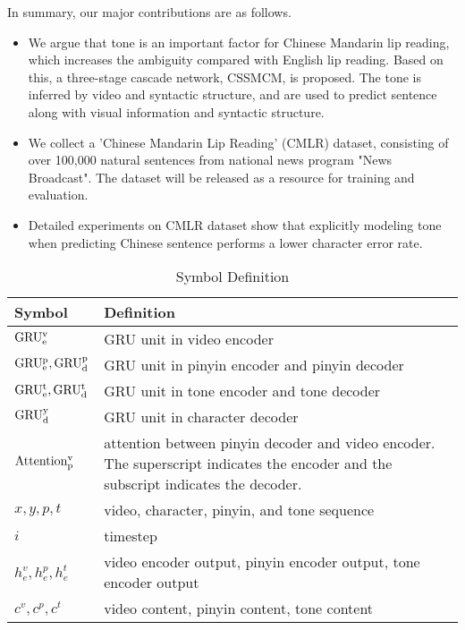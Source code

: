 \documentclass[sigconf]{acmart}
\begin{document}
In summary, our major contributions are as follows.
\begin{itemize}
\item We argue that tone is an important factor for Chinese Mandarin lip reading, which increases the ambiguity compared with English lip reading. Based on this, a three-stage cascade network, CSSMCM, is proposed. The tone is inferred by video and syntactic structure, and are used to predict sentence along with visual information and syntactic structure.
\item We collect a 'Chinese Mandarin Lip Reading' (CMLR) dataset, consisting of over 100,000 natural sentences from national news program "News Broadcast". The dataset will be released as a resource for training and evaluation.
\item Detailed experiments on CMLR dataset show that explicitly modeling tone when predicting Chinese sentence performs a lower character error rate.
\end{itemize}

\begin{table}[htb]
\small
\centering
\caption {Symbol Definition}
\label{table:symbol_definition}
\begin{tabular}{l | p{5.8cm}}
  \hline 
  \textbf{Symbol}     & \textbf{Definition}                                     \\ \hline     
    ${\rm GRU^v_e}$    &  GRU unit in video encoder                                \\ \hline
    ${\rm GRU^p_e}, {\rm GRU^p_d}$    &  GRU unit in pinyin encoder and pinyin decoder\\ \hline    
    ${\rm GRU^t_e}, {\rm GRU^t_d}$    &  GRU unit in tone encoder and tone decoder    \\ \hline
    ${\rm GRU^y_d}$    &  GRU unit in character decoder                            \\ \hline
    ${\rm Attention^v_p}$  & attention between pinyin decoder and video encoder. The superscript indicates the encoder and the subscript indicates the decoder.\\ \hline
    $x, y, p, t$    &  video, character, pinyin, and tone sequence              \\ \hline
    $i$         & timestep \\ \hline
    $h^v_e, h^p_e, h^t_e$ &  video encoder output, pinyin encoder output, tone encoder output                \\ \hline
    $c^v, c^p, c^t$ &  video content, pinyin content, tone content               \\ \hline
\end{tabular} 
\end{table}
\end{document}

